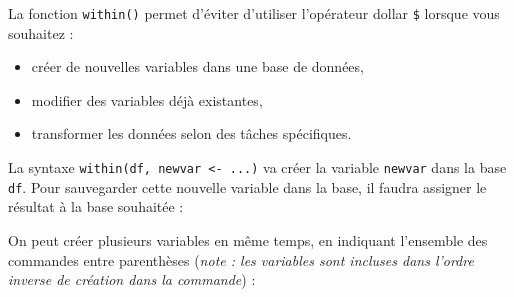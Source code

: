 \documentclass[
]{book}
\newenvironment{Shaded}{\begin{snugshade}}{\end{snugshade}}
\newcommand{\AttributeTok}[1]{\textcolor[rgb]{0.13,0.29,0.53}{#1}}
\newcommand{\CommentTok}[1]{\textcolor[rgb]{0.56,0.35,0.01}{\textit{#1}}}
\newcommand{\DocumentationTok}[1]{\textcolor[rgb]{0.56,0.35,0.01}{\textbf{\textit{#1}}}}
\newcommand{\FunctionTok}[1]{\textcolor[rgb]{0.13,0.29,0.53}{\textbf{#1}}}
\newcommand{\NormalTok}[1]{#1}
\newcommand{\OtherTok}[1]{\textcolor[rgb]{0.56,0.35,0.01}{#1}}
\newcommand{\SpecialCharTok}[1]{\textcolor[rgb]{0.81,0.36,0.00}{\textbf{#1}}}
\newcommand{\StringTok}[1]{\textcolor[rgb]{0.31,0.60,0.02}{#1}}
\providecommand{\tightlist}{%
  \setlength{\itemsep}{0pt}\setlength{\parskip}{0pt}}
\begin{document}
La fonction \texttt{within()} permet d'éviter d'utiliser l'opérateur dollar \texttt{\$} lorsque vous souhaitez :

\begin{itemize}
\tightlist
\item
  créer de nouvelles variables dans une base de données,
\item
  modifier des variables déjà existantes,
\item
  transformer les données selon des tâches spécifiques.
\end{itemize}

La syntaxe \texttt{within(df,\ newvar\ \textless{}-\ ...)} va créer la variable \texttt{newvar} dans la base \texttt{df}. Pour sauvegarder cette nouvelle variable dans la base, il faudra assigner le résultat à la base souhaitée :

\begin{Shaded}
\end{Shaded}

On peut créer plusieurs variables en même temps, en indiquant l'ensemble des commandes entre parenthèses (\emph{note : les variables sont incluses dans l'ordre inverse de création dans la commande}) :
\end{document}
